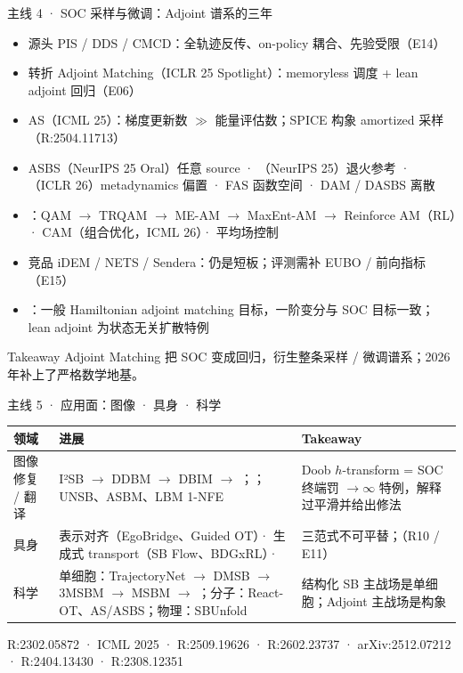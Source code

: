 \documentclass[aspectratio=169,10pt]{beamer}
\begin{document}
\begin{frame}{主线 4 · SOC 采样与微调：Adjoint 谱系的三年}
\begin{itemize}
\item 源头 PIS / DDS / CMCD：全轨迹反传、on-policy 耦合、先验受限（E14）
\item 转折 Adjoint Matching（ICLR 25 Spotlight）：memoryless 调度 + lean adjoint 回归（E06）
\item AS（ICML 25）：梯度更新数 $\gg$ 能量评估数；SPICE 构象 amortized 采样（R:2504.11713）
\item ASBS（NeurIPS 25 Oral）任意 source · （NeurIPS 25）退火参考 · （ICLR 26）metadynamics 偏置 · FAS 函数空间 · DAM / DASBS 离散
\item {}：QAM $\to$ TRQAM $\to$ ME-AM $\to$ MaxEnt-AM $\to$ Reinforce AM（RL）· CAM（组合优化，ICML 26）· 平均场控制
\item 竞品 iDEM / NETS / Sendera：仍是短板；评测需补 EUBO / 前向指标（E15）
\item {}：一般 Hamiltonian adjoint matching 目标，一阶变分与 SOC 目标一致；lean adjoint 为状态无关扩散特例
\end{itemize}
\vspace{4pt}
\begin{alertblock}{Takeaway}
Adjoint Matching 把 SOC 变成回归，衍生整条采样 / 微调谱系；2026 年补上了严格数学地基。
\end{alertblock}
\end{frame}

\begin{frame}{主线 5 · 应用面：图像 · 具身 · 科学}
\vspace{4pt}
\begin{center}\footnotesize\begin{tabular}{P{1.9cm}p{6.0cm}p{5.2cm}}\toprule
领域 & 进展 & Takeaway \\\midrule
图像修复 / 翻译 & I²SB $\to$ DDBM $\to$ DBIM $\to$ ；；UNSB、ASBM、LBM 1-NFE & Doob $h$-transform = SOC 终端罚 $\to\infty$ 特例，解释过平滑并给出修法 \\\addlinespace[3pt]
具身 & 表示对齐（EgoBridge、Guided OT）· 生成式 transport（SB Flow、BDGxRL）·  & 三范式不可平替；（R10 / E11） \\\addlinespace[3pt]
科学 & 单细胞：TrajectoryNet $\to$ DMSB $\to$ 3MSBM $\to$ MSBM $\to$ ；分子：React-OT、AS/ASBS；物理：SBUnfold & 结构化 SB 主战场是单细胞；Adjoint 主战场是构象 \\\bottomrule
\end{tabular}\end{center}
\vspace{2pt}
{\small R:2302.05872 · ICML 2025 · R:2509.19626 · R:2602.23737 · arXiv:2512.07212 · R:2404.13430 · R:2308.12351}
\end{frame}
\end{document}
